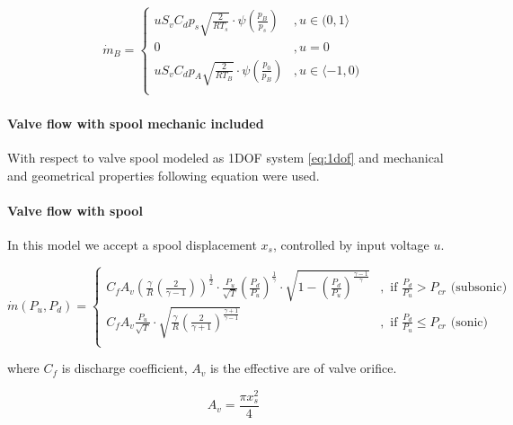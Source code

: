 \documentclass[class=article, crop=false]{standalone}
\begin{document}
\begin{align}
    \dot{m}_B =
    \begin{cases}
        u S_v C_d p_s \sqrt{\frac{2}{RT_s}}
        \cdot \psi\left(\frac{p_B}{p_s}\right)  &,   u \in (0, 1 \rangle \\
        0   &,  u = 0 \\
        u S_v C_d p_A \sqrt{\frac{2}{RT_B}}
        \cdot \psi\left(\frac{p_0}{p_B}\right)  &,   u \in \langle -1, 0) \\
    \end{cases}
\end{align}

\paragraph{Valve flow with spool mechanic included}

With respect to valve spool modeled as 1DOF system \ref{eq:1dof} and
mechanical and geometrical properties following equation were used.

\paragraph{Valve flow with spool}
In this model we accept a spool displacement $x_s$, controlled by input
voltage $u$.

\begin{equation}
    \dot{m}(P_u, P_d) = 
    \begin{cases}
        C_f A_v
        \left(\frac{\gamma}{R}\left(\frac{2}{\gamma-1}\right)\right)^{\frac{1}{2}}
        \cdot
        \frac{P_u}{\sqrt{T}}\left(\frac{P_d}{P_u}\right)^{\frac{1}{\gamma}}
        \cdot 
        \sqrt{1 - \left(\frac{P_d}{P_u}\right)^{\frac{\gamma-1}{\gamma}}} &,
            \text{ if } \frac{P_d}{P_u}>P_{cr} \text{ (subsonic)} \\
        C_f A_v \frac{P_u}{\sqrt{T}}\cdot \sqrt{\frac{\gamma}{R}
        \left(\frac{2}{\gamma + 1}\right)^{\frac{\gamma+1}{\gamma-1}}} &,
            \text{ if }  \frac{P_d}{P_u} \le P_{cr} \text{ (sonic)} \\
    \end{cases}
    \label{eq:valve_2}
\end{equation}

where $C_f$ is discharge coefficient, $A_v$ is the effective are of valve
orifice.

\begin{equation}
    A_v = \frac{\pi x_s^2}{4}
    \label{eq:A_v}
\end{equation}
\end{document}
